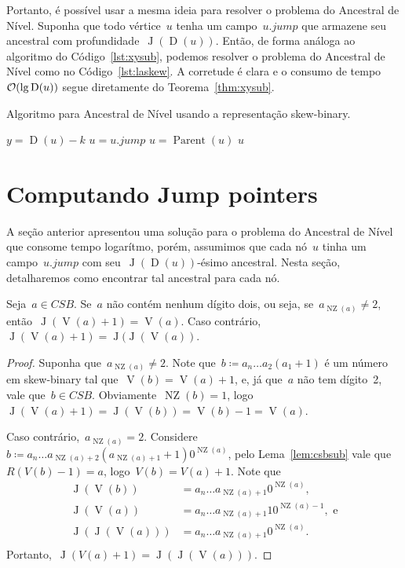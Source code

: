 \documentclass[main.tex]{subfiles}
\newcommand{\Par}{\operatorname{Parent}}
\newcommand{\Dep}{\operatorname{D}}
\newcommand{\NZ}{\operatorname{NZ}}
\newcommand{\CSB}{\textit{CSB}}
\renewcommand{\V}{\operatorname{V}}
\newcommand{\J}{\operatorname{J}}
\begin{document}
\newcommand{\jmp}{\mathit{jump}}
Portanto, é possível usar a mesma ideia para resolver o problema do Ancestral de Nível. Suponha que todo vértice~$u$ tenha um campo~$u.\jmp$ que armazene seu ancestral com profundidade~$\J(\Dep(u))$. Então, de forma análoga ao algoritmo do Código~\ref{lst:xysub}, podemos resolver o problema do Ancestral de Nível como no Código~\ref{lst:laskew}. A corretude é clara e o consumo de tempo~$\Oh(\lg\Dep(u))$ segue diretamente do Teorema~\ref{thm:xysub}.

\begin{algorithm}
\caption{Algoritmo para Ancestral de Nível usando a representação skew-binary.} \label{lst:laskew}
\begin{algorithmic}[1]
		\State $y = \Dep(u) - k$
		\While{$\Dep(u) \neq y$}
			\If{$\Dep(u.\jmp) \geq y$}
				\State $u = u.\jmp$
			\Else
				\State $u = \Par(u)$
			\EndIf
		\EndWhile
		\State \Return $u$
	\EndFunction
\end{algorithmic}
\end{algorithm}

\section{Computando Jump pointers}

A seção anterior apresentou uma solução para o problema do Ancestral de Nível que consome tempo logarítmo, porém, assumimos que cada nó~$u$ tinha um campo~$u.\jmp$ com seu~$\J(\Dep(u))$-ésimo ancestral. Nesta seção, detalharemos como encontrar tal ancestral para cada nó.

\begin{theorem} \label{thm:csbj+1}
	Seja~$a \in \CSB$. Se~$a$ não contém nenhum dígito dois, ou seja, se~$a_{\NZ(a)} \neq 2$, então~$\J(\V(a) + 1) = \V(a)$. Caso contrário,~$\J(\V(a) + 1) = \J(\J(\V(a))$.
\end{theorem}
\begin{proof}
	Suponha que~$a_{\NZ(a)} \neq 2$. Note que~$b \coloneqq a_n \ldots a_2 (a_1 + 1)$ é um número em skew-binary tal que~${\V(b) = \V(a) + 1}$, e, já que~$a$ não tem dígito~2, vale que~${b \in \CSB}$. Obviamente~${\NZ(b) = 1}$, logo~${\J(\V(a) + 1) = \J(\V(b)) = \V(b) - 1 = \V(a)}$.

	Caso contrário,~${a_{\NZ(a)} = 2}$. Considere~${b \coloneqq a_n \ldots a_{\NZ(a) + 2} (a_{\NZ(a) + 1} + 1) 0^{\NZ(a)}}$, pelo Lema~\ref{lem:csbsub} vale que~${R(V(b) - 1) = a}$, logo~${V(b) = V(a) + 1}$. Note que \vspace{-2ex}
	\[
	\begin{array}{ll}
		\J(\V(b))     &= a_n \ldots a_{\NZ(a) + 1} 0^{\NZ(a)}, \\
		\J(\V(a))     &= a_n \ldots a_{\NZ(a) + 1} 10^{\NZ(a)-1},\text{ e} \\
		\J(\J(\V(a))) &= a_n \ldots a_{\NZ(a) + 1} 0^{\NZ(a)}. \\
	\end{array}
	\]
	Portanto,~$\J(V(a) + 1) = \J(\J(\V(a)))$.
\end{proof}
\end{document}
